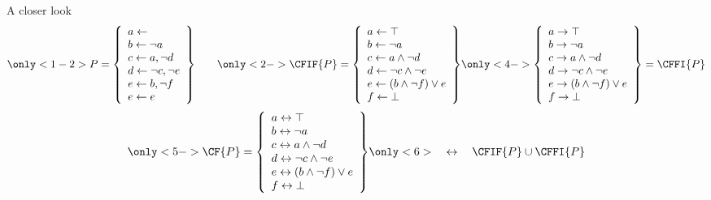 \begin{frame}{A closer look}
\[
\only<1-2>{%
P
=
 \left\{
    \begin{array}{l}
      a \leftarrow                  \\
      b \leftarrow \neg a          \\
      c \leftarrow a, \neg d       \\
      d \leftarrow \neg c, \neg e \\
      e \leftarrow b, \neg f       \\
      e \leftarrow e
    \end{array}
  \right\}
\qquad}
\only<2->{%
\CFIF{P}
=
 \left\{
    \begin{array}{l}
      a \leftarrow \top                  \\
      b \leftarrow \neg{a}               \\
      c \leftarrow a\wedge \neg{d}       \\
      d \leftarrow \neg{c}\wedge \neg{e} \\
      e \leftarrow (b\wedge \neg{f}) \vee e\\
      f \leftarrow \bot
    \end{array}
  \right\}
}
\only<4->{%
 \left\{
    \begin{array}{l}
      a \rightarrow \top                  \\
      b \rightarrow \neg{a}               \\
      c \rightarrow a\wedge \neg{d}       \\
      d \rightarrow \neg{c}\wedge \neg{e} \\
      e \rightarrow (b\wedge \neg{f}) \vee e\\
      f \rightarrow \bot
    \end{array}
  \right\}
  =
  \CFFI{P}}
\]
\[
\only<5->{%
  \CF{P}
  =
  \left\{
    \begin{array}{l}
      a \leftrightarrow \top                  \\
      b \leftrightarrow \neg{a}               \\
      c \leftrightarrow a\wedge \neg{d}       \\
      d \leftrightarrow \neg{c}\wedge \neg{e} \\
      e \leftrightarrow (b\wedge \neg{f}) \vee e\\
      f \leftrightarrow \bot
    \end{array}
  \right\}}
\only<6>{\quad\leftrightarrow\quad\CFIF{P}\cup\CFFI{P}}
\]
\end{frame}
